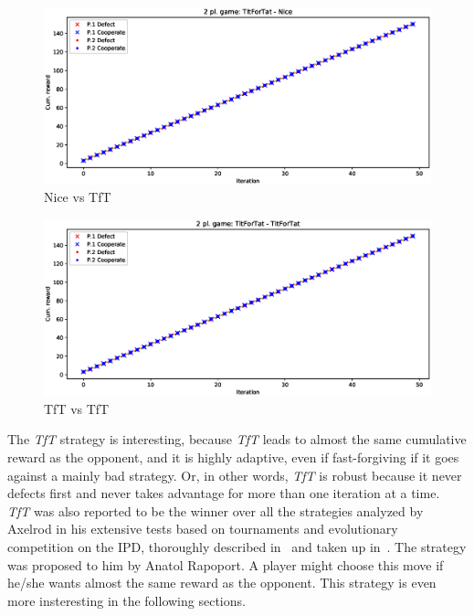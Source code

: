 \documentclass[journal,a4paper,10pt,twoside]{IEEEtran} %
\begin{document}
\begin{figure}[!ht]
    \centering
    \includegraphics[width=1\columnwidth]{../img/ipd2p/ipd2p-rewards-TitForTat-Nice}
    \caption{Nice vs TfT}
    \label{fig:nicevstft}
\end{figure}

\begin{figure}[!ht]
    \centering
    \includegraphics[width=1\columnwidth]{../img/ipd2p/ipd2p-rewards-TitForTat-TitForTat}
    \caption{TfT vs TfT}
    \label{fig:tftvstft}
\end{figure}

The \textit{TfT} strategy is interesting, because \textit{TfT} leads to almost the same cumulative reward as the opponent, and it is highly adaptive, even if fast-forgiving if it goes against a mainly bad strategy.
Or, in other words, \textit{TfT} is robust because it never defects first and never takes advantage for more than one iteration at a time.~\cite{fogelEvolvingBehaviors}
\textit{TfT} was also reported to be the winner over all the strategies analyzed by Axelrod in his extensive tests based on tournaments and evolutionary competition on the IPD, thoroughly described in~\cite{axelrod1981evolution,axelrod1984evolution} and taken up in~\cite{mathieu2017}.
The strategy was proposed to him by Anatol Rapoport.
A player might choose this move if he/she wants almost the same reward as the opponent. This strategy is even more insteresting in the following sections.
\end{document}
